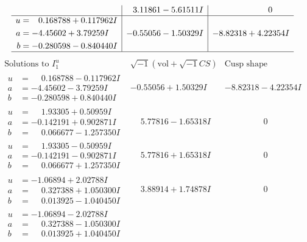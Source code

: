 \documentclass[1p]{elsarticle_modified}
\theoremstyle{definition}
\newcommand{\I}{\sqrt{-1}}
\begin{document}
$$\begin{array}{c|c|c}
 & \phantom{-}3.11861 - 5.61511 I & \phantom{-0.000000 } 0 \\ \hline\begin{aligned}
u &= \phantom{-}0.168788 + 0.117962 I \\
a &= -4.45602 + 3.79259 I \\
b &= -0.280598 - 0.840440 I\end{aligned}
 & -0.55056 - 1.50329 I & -8.82318 + 4.22354 I\\
 \hline 
 \end{array}$$\newpage$$\begin{array}{c|c|c}  
\text{Solutions to }I^u_{1}& \I (\text{vol} + \sqrt{-1}CS) & \text{Cusp shape}\\
 \hline 
\begin{aligned}
u &= \phantom{-}0.168788 - 0.117962 I \\
a &= -4.45602 - 3.79259 I \\
b &= -0.280598 + 0.840440 I\end{aligned}
 & -0.55056 + 1.50329 I & -8.82318 - 4.22354 I \\ \hline\begin{aligned}
u &= \phantom{-}1.93305 + 0.50959 I \\
a &= -0.142191 + 0.902871 I \\
b &= \phantom{-}0.066677 - 1.257350 I\end{aligned}
 & \phantom{-}5.77816 - 1.65318 I & \phantom{-0.000000 } 0 \\ \hline\begin{aligned}
u &= \phantom{-}1.93305 - 0.50959 I \\
a &= -0.142191 - 0.902871 I \\
b &= \phantom{-}0.066677 + 1.257350 I\end{aligned}
 & \phantom{-}5.77816 + 1.65318 I & \phantom{-0.000000 } 0 \\ \hline\begin{aligned}
u &= -1.06894 + 2.02788 I \\
a &= \phantom{-}0.327388 + 1.050300 I \\
b &= \phantom{-}0.013925 - 1.040450 I\end{aligned}
 & \phantom{-}3.88914 + 1.74878 I & \phantom{-0.000000 } 0 \\ \hline\begin{aligned}
u &= -1.06894 - 2.02788 I \\
a &= \phantom{-}0.327388 - 1.050300 I \\
b &= \phantom{-}0.013925 + 1.040450 I\end{aligned}

\end{array}$$
\end{document}
